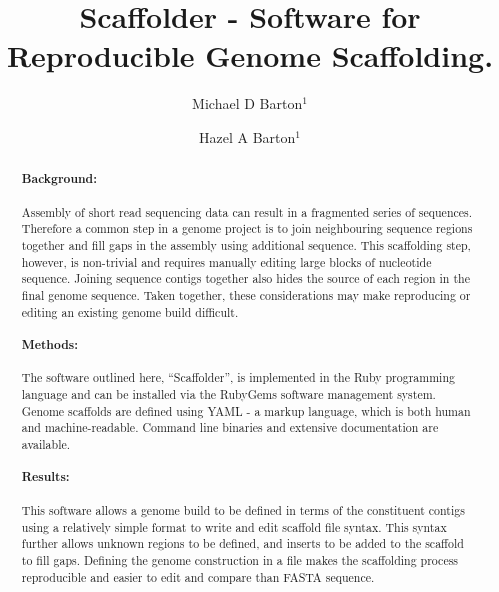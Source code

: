 \documentclass[10pt]{bmc_article}
\newenvironment{bmcformat}{\begin{raggedright}\baselineskip20pt\sloppy\setboolean{publ}{false}}{\end{raggedright}\baselineskip20pt\sloppy}
\begin{document}
\begin{bmcformat}

\title{Scaffolder - Software for Reproducible Genome Scaffolding.} %

\author{
  Michael D Barton$^{1}$\correspondingauthor%
\and
  Hazel A Barton$^1$%
      }

\address{\iid(1) Department of Biological Sciences, Northern Kentucky %
University, Nunn Drive, Highland Heights, KY 41076 }%

\maketitle

\clearpage

\begin{abstract} %

  \paragraph*{Background:} Assembly of short read sequencing data can result in
  a fragmented series of sequences. Therefore a common step in a genome project
  is to join neighbouring sequence regions together and fill gaps in the
  assembly using additional sequence. This scaffolding step, however, is
  non-trivial and requires manually editing large blocks of nucleotide
  sequence. Joining sequence contigs together also hides the source of each
  region in the final genome sequence. Taken together, these considerations may
  make reproducing or editing an existing genome build difficult.

  \paragraph*{Methods:} The software outlined here, ``Scaffolder'', is
  implemented in the Ruby programming language and can be installed via the
  RubyGems software management system. Genome scaffolds are defined using YAML
  - a markup language, which is both human and machine-readable. Command line
  binaries and extensive documentation are available.

  \paragraph*{Results:} This software allows a genome build to be defined in
  terms of the constituent contigs using a relatively simple format to write
  and edit scaffold file syntax. This syntax further allows  unknown regions to
  be defined, and inserts to be added to the scaffold to fill gaps. Defining
  the genome construction in a file makes the scaffolding process reproducible
  and easier to edit and compare than FASTA sequence.


\end{abstract}
\end{bmcformat}
\end{document}
